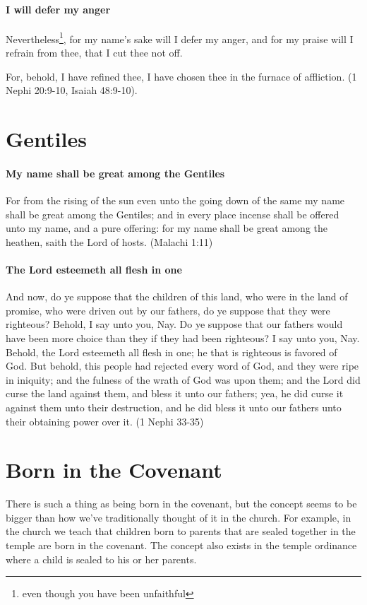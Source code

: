 \paragraph{I will defer my anger}
Nevertheless\footnote{even though you have been unfaithful}, for my name's sake will I defer my anger, and for my praise will I refrain from thee, that I cut thee not off.

For, behold, I have refined thee, I have chosen thee in the furnace of affliction. (1 Nephi 20:9-10, Isaiah 48:9-10).

\section{Gentiles}

\paragraph{My name shall be great among the Gentiles}
For from the rising of the sun even unto the going down of the same my name shall be great among the Gentiles; and in every place incense shall be offered unto my name, and a pure offering: for my name shall be great among the heathen, saith the Lord of hosts. (Malachi 1:11)

\paragraph{The Lord esteemeth all flesh in one}
And now, do ye suppose that the children of this land, who were in the land of promise, who were driven out by our fathers, do ye suppose that they were righteous? Behold, I say unto you, Nay. Do ye suppose that our fathers would have been more choice than they if they had been righteous? I say unto you, Nay. Behold, the Lord esteemeth all flesh in one; he that is righteous is favored of God. But behold, this people had rejected every word of God, and they were ripe in iniquity; and the fulness of the wrath of God was upon them; and the Lord did curse the land against them, and bless it unto our fathers; yea, he did curse it against them unto their destruction, and he did bless it unto our fathers unto their obtaining power over it. (1 Nephi 33-35)

\section{Born in the Covenant}

There is such a thing as being born in the covenant, but the concept seems to be bigger than how we've traditionally thought of it in the church. For example, in the church we teach that children born to parents that are sealed together in the temple are born in the covenant. The concept also exists in the temple ordinance where a child is sealed to his or her parents.

